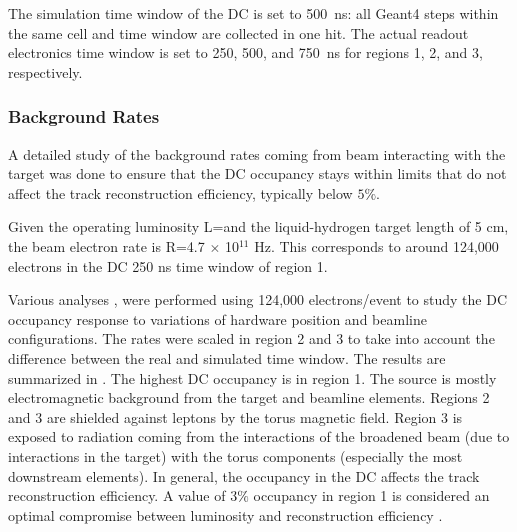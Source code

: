 The simulation time window of the DC is set to 500~ns: all Geant4 steps within the same cell and time window are
collected in one hit.
The actual readout electronics time window is set to 250, 500, and 750~ns for regions 1, 2, and 3, respectively.


\subsubsection{Background Rates}

A detailed study of the background rates coming from beam interacting with the target was done to ensure that
the DC occupancy stays within limits that do not affect the track reconstruction efficiency, typically below $5\%$.

Given the operating luminosity L=\cLuminosity and the liquid-hydrogen target length of 5 cm, the beam electron rate
is R=4.7 $\times$ 10$^{11}$ Hz. This corresponds to around 124,000 electrons in the DC 250 ns time window of region 1.

Various analyses \cite{targetStudy, clas12Beamline, clas12Background}, were performed using 124,000 electrons/event
to study the DC occupancy response to variations of hardware position and beamline configurations.
The rates were scaled in region 2 and 3 to take into account the difference between the real and simulated time window.
The results are summarized in . The highest DC occupancy is in region 1.
The source is mostly electromagnetic background from the target and beamline elements.
Regions 2 and 3 are shielded against leptons by the torus magnetic field.
Region 3 is exposed to radiation coming from the interactions of the broadened beam
(due to interactions in the target) with the torus components (especially the most downstream elements).
In general, the occupancy in the DC affects the track reconstruction efficiency. A value of 3$\%$ occupancy in region 1
is considered an optimal compromise between luminosity and reconstruction efficiency \cite{recon-nim}.

